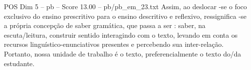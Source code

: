 \begin{textsample}{POS Dim 5 – pb – Score 13.00 – pb/pb\_em\_23.txt}
Assim, ao deslocar -se o foco exclusivo do ensino prescritivo para o ensino descritivo e reflexivo, ressignifica -se a própria concepção de saber gramática, que passa a ser : saber, na escuta/leitura, construir sentido interagindo com o texto, levando em conta os recursos linguístico-enunciativos presentes e percebendo sua inter-relação.
Portanto, nossa unidade de trabalho é o texto, preferencialmente o texto do/da estudante.

\end{textsample}
